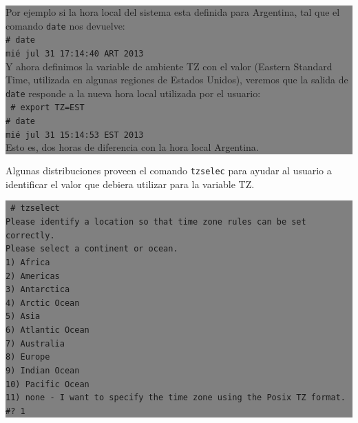 \documentclass[12pt]{article}
\begin{document}
\colorbox{grey}{\parbox[t]{0.95\linewidth}{ \vspace*{0.5cm} { 
Por ejemplo si la hora local del sistema esta definida para Argentina, tal que 
el comando \texttt{date} nos devuelve: \\
{\tt\# date \\
mié jul 31 17:14:40 ART 2013} \\
Y ahora definimos la variable de ambiente TZ con el valor (Eastern Standard Time, utilizada en 
algunas regiones de Estados Unidos), veremos que la salida de \texttt{date} responde 
a la nueva hora local utilizada por el usuario: \\
{\tt
\# export TZ=EST \\
\# date \\
mié jul 31 15:14:53 EST 2013 \\
} 
Esto es, dos horas de diferencia con la hora local Argentina. 
 } \vspace*{0.5cm} } } 

Algunas distribuciones proveen el comando \texttt{tzselec} para ayudar al usuario a 
identificar el valor que debiera utilizar para la variable TZ.

\colorbox{grey}{\parbox[t]{0.95\linewidth}{ \vspace*{0.5cm} { 
{\tt 
\# tzselect \\
Please identify a location so that time zone rules can be set correctly.\\
Please select a continent or ocean.\\
 1) Africa\\
 2) Americas\\
 3) Antarctica\\
 4) Arctic Ocean\\
 5) Asia\\
 6) Atlantic Ocean\\
 7) Australia\\
 8) Europe\\
 9) Indian Ocean\\
10) Pacific Ocean\\
11) none - I want to specify the time zone using the Posix TZ format.\\
\#? 1\\
}
 } \vspace*{0.5cm} } } 
\end{document}
